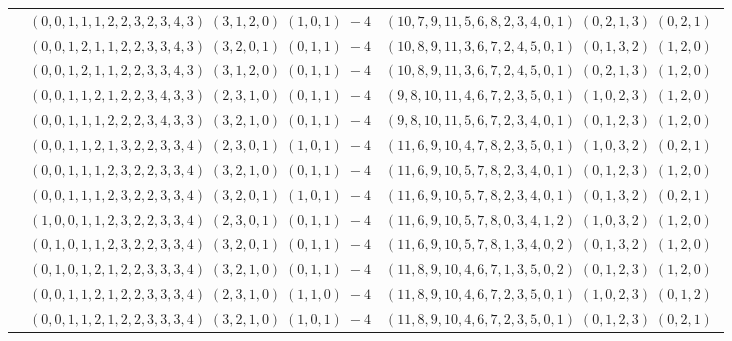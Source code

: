 \documentclass[11pt]{article}
\begin{document}
\begin{longtable}[l]{|c|c|c|}
 \cline{2-3} 
 & $(0 ,0 ,1 ,1 ,1 ,2 ,2 ,3 ,2 ,3 ,4 ,3) \;(3 ,1 ,2 ,0) \;(1 ,0 ,1) \;-4$ & $(10 ,7 ,9 ,11 ,5 ,6 ,8 ,2 ,3 ,4 ,0 ,1) \;(0 ,2 ,1 ,3) \;(0 ,2 ,1) \;$\\ 
 \cline{2-3} 
 & $(0 ,0 ,1 ,2 ,1 ,1 ,2 ,2 ,3 ,3 ,4 ,3) \;(3 ,2 ,0 ,1) \;(0 ,1 ,1) \;-4$ & $(10 ,8 ,9 ,11 ,3 ,6 ,7 ,2 ,4 ,5 ,0 ,1) \;(0 ,1 ,3 ,2) \;(1 ,2 ,0) \;$\\ 
 \cline{2-3} 
 & $(0 ,0 ,1 ,2 ,1 ,1 ,2 ,2 ,3 ,3 ,4 ,3) \;(3 ,1 ,2 ,0) \;(0 ,1 ,1) \;-4$ & $(10 ,8 ,9 ,11 ,3 ,6 ,7 ,2 ,4 ,5 ,0 ,1) \;(0 ,2 ,1 ,3) \;(1 ,2 ,0) \;$\\ 
 \cline{2-3} 
 & $(0 ,0 ,1 ,1 ,2 ,1 ,2 ,2 ,3 ,4 ,3 ,3) \;(2 ,3 ,1 ,0) \;(0 ,1 ,1) \;-4$ & $(9 ,8 ,10 ,11 ,4 ,6 ,7 ,2 ,3 ,5 ,0 ,1) \;(1 ,0 ,2 ,3) \;(1 ,2 ,0) \;$\\ 
 \cline{2-3} 
 & $(0 ,0 ,1 ,1 ,1 ,2 ,2 ,2 ,3 ,4 ,3 ,3) \;(3 ,2 ,1 ,0) \;(0 ,1 ,1) \;-4$ & $(9 ,8 ,10 ,11 ,5 ,6 ,7 ,2 ,3 ,4 ,0 ,1) \;(0 ,1 ,2 ,3) \;(1 ,2 ,0) \;$\\ 
 \cline{2-3} 
 & $(0 ,0 ,1 ,1 ,2 ,1 ,3 ,2 ,2 ,3 ,3 ,4) \;(2 ,3 ,0 ,1) \;(1 ,0 ,1) \;-4$ & $(11 ,6 ,9 ,10 ,4 ,7 ,8 ,2 ,3 ,5 ,0 ,1) \;(1 ,0 ,3 ,2) \;(0 ,2 ,1) \;$\\ 
 \cline{2-3} 
 & $(0 ,0 ,1 ,1 ,1 ,2 ,3 ,2 ,2 ,3 ,3 ,4) \;(3 ,2 ,1 ,0) \;(0 ,1 ,1) \;-4$ & $(11 ,6 ,9 ,10 ,5 ,7 ,8 ,2 ,3 ,4 ,0 ,1) \;(0 ,1 ,2 ,3) \;(1 ,2 ,0) \;$\\ 
 \cline{2-3} 
 & $(0 ,0 ,1 ,1 ,1 ,2 ,3 ,2 ,2 ,3 ,3 ,4) \;(3 ,2 ,0 ,1) \;(1 ,0 ,1) \;-4$ & $(11 ,6 ,9 ,10 ,5 ,7 ,8 ,2 ,3 ,4 ,0 ,1) \;(0 ,1 ,3 ,2) \;(0 ,2 ,1) \;$\\ 
 \cline{2-3} 
 & $(1 ,0 ,0 ,1 ,1 ,2 ,3 ,2 ,2 ,3 ,3 ,4) \;(2 ,3 ,0 ,1) \;(0 ,1 ,1) \;-4$ & $(11 ,6 ,9 ,10 ,5 ,7 ,8 ,0 ,3 ,4 ,1 ,2) \;(1 ,0 ,3 ,2) \;(1 ,2 ,0) \;$\\ 
 \cline{2-3} 
 & $(0 ,1 ,0 ,1 ,1 ,2 ,3 ,2 ,2 ,3 ,3 ,4) \;(3 ,2 ,0 ,1) \;(0 ,1 ,1) \;-4$ & $(11 ,6 ,9 ,10 ,5 ,7 ,8 ,1 ,3 ,4 ,0 ,2) \;(0 ,1 ,3 ,2) \;(1 ,2 ,0) \;$\\ 
 \cline{2-3} 
 & $(0 ,1 ,0 ,1 ,2 ,1 ,2 ,2 ,3 ,3 ,3 ,4) \;(3 ,2 ,1 ,0) \;(0 ,1 ,1) \;-4$ & $(11 ,8 ,9 ,10 ,4 ,6 ,7 ,1 ,3 ,5 ,0 ,2) \;(0 ,1 ,2 ,3) \;(1 ,2 ,0) \;$\\ 
 \cline{2-3} 
 & $(0 ,0 ,1 ,1 ,2 ,1 ,2 ,2 ,3 ,3 ,3 ,4) \;(2 ,3 ,1 ,0) \;(1 ,1 ,0) \;-4$ & $(11 ,8 ,9 ,10 ,4 ,6 ,7 ,2 ,3 ,5 ,0 ,1) \;(1 ,0 ,2 ,3) \;(0 ,1 ,2) \;$\\ 
 \cline{2-3} 
 & $(0 ,0 ,1 ,1 ,2 ,1 ,2 ,2 ,3 ,3 ,3 ,4) \;(3 ,2 ,1 ,0) \;(1 ,0 ,1) \;-4$ & $(11 ,8 ,9 ,10 ,4 ,6 ,7 ,2 ,3 ,5 ,0 ,1) \;(0 ,1 ,2 ,3) \;(0 ,2 ,1) \;$\\ 

\end{longtable}
\end{document}
